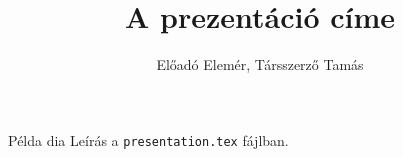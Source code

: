 \documentclass[t,aspectratio=43]{beamer}
\title{A prezentáció címe}
\author{Előadó Elemér, Társszerző Tamás}
\begin{document}
	{
		\begin{frame}
			\titlepage
		\end{frame}
	}
\addtocounter{framenumber}{-1}
  
\begin{frame}{Példa dia}
  Leírás a \texttt{presentation.tex} fájlban.
\end{frame}
\end{document}
